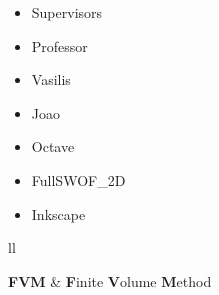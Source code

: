 \documentclass[
11pt, %
english, %
singlespacing, %
headsepline, %
]{MastersDoctoralThesis} %
\begin{document}

\begin{acknowledgements}
\addchaptertocentry{\acknowledgementname} %
\begin{itemize}
\itemsep0em
  \item Supervisors
  \item Professor
  \item Vasilis
  \item Joao
  \item Octave
  \item FullSWOF\_2D
  \item Inkscape
\end{itemize}
\end{acknowledgements}



\begin{abbreviations}{ll} %

\textbf{FVM} & \textbf{F}inite \textbf{V}olume \textbf{M}ethod\\


\end{abbreviations}


\tableofcontents


\mainmatter %

\pagestyle{thesis} %







\end{document}
